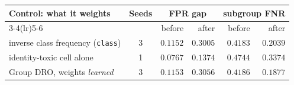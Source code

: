 \begin{tabular}{lcrrrr}
\toprule
Control: what it weights & Seeds & \multicolumn{2}{c}{FPR gap} & \multicolumn{2}{c}{subgroup FNR} \\
\cmidrule(lr){3-4}\cmidrule(lr){5-6}
 & & before & after & before & after \\
\midrule
inverse class frequency (\texttt{class}) & 3 & $0.1152$ & $0.3005$ & $0.4183$ & $0.2039$ \\
identity-toxic cell alone & 1 & $0.0767$ & $0.1374$ & $0.4744$ & $0.3374$ \\
Group DRO, weights \emph{learned} & 3 & $0.1153$ & $0.3056$ & $0.4186$ & $0.1877$ \\
\bottomrule
\end{tabular}
